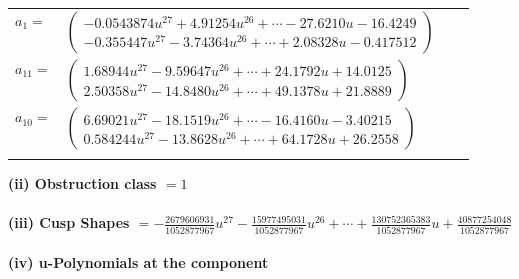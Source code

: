 \documentclass[1p]{elsarticle_modified}
\theoremstyle{definition}
\begin{document}
\begin{tabular}{m{7pt} m{180pt} m{7pt} m{180pt} }
\flushright $a_{1}=$&$\begin{pmatrix}-0.0543874 u^{27}+4.91254 u^{26}+\cdots-27.6210 u-16.4249\\-0.355447 u^{27}-3.74364 u^{26}+\cdots+2.08328 u-0.417512\end{pmatrix}$ \\
\flushright $a_{11}=$&$\begin{pmatrix}1.68944 u^{27}-9.59647 u^{26}+\cdots+24.1792 u+14.0125\\2.50358 u^{27}-14.8480 u^{26}+\cdots+49.1378 u+21.8889\end{pmatrix}$ \\
\flushright $a_{10}=$&$\begin{pmatrix}6.69021 u^{27}-18.1519 u^{26}+\cdots-16.4160 u-3.40215\\0.584244 u^{27}-13.8628 u^{26}+\cdots+64.1728 u+26.2558\end{pmatrix}$\\&\end{tabular}
\flushleft \textbf{(ii) Obstruction class $= 1$}\\~\\
\flushleft \textbf{(iii) Cusp Shapes $= -\frac{2679606931}{1052877967} u^{27}-\frac{15977495031}{1052877967} u^{26}+\cdots+\frac{130752365383}{1052877967} u+\frac{40877254048}{1052877967}$}\\~\\
\newpage\renewcommand{\arraystretch}{1}
\flushleft \textbf{(iv) u-Polynomials at the component}\newline \\
\end{document}
